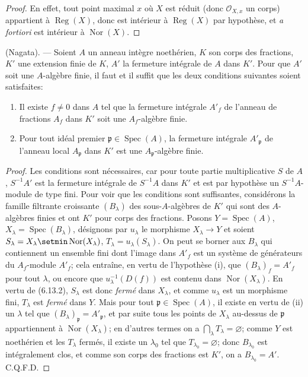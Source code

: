 \begin{proof}
En effet, tout point maximal $x$ où $X$ est réduit (donc
$\mathcal O_{X,x}$ un corps) appartient à $\operatorname{Reg}(X)$, donc est
intérieur à $\operatorname{Reg}(X)$ par hypothèse, et \emph{a fortiori} est
intérieur à $\operatorname{Nor}(X)$.
\end{proof}

\begin{proposition}[6.13.6]
\label{IV.2.s6.13.6-fr}
\textnormal{(Nagata).} --- Soient $A$ un anneau intègre noethérien, $K$ son
corps des fractions, $K'$ une extension finie de $K$, $A'$ la fermeture
intégrale de $A$ dans $K'$. Pour que $A'$ soit une $A$-algèbre finie, il
faut et il suffit que les deux conditions suivantes soient satisfaites:
\begin{enumerate}
\item[\textup{(i)}] Il existe $f\neq0$ dans $A$ tel que la fermeture intégrale $A'_f$
de l'anneau de fractions $A_f$ dans $K'$ soit une $A_f$-algèbre finie.
\item[\textup{(ii)}] Pour tout idéal premier $\mathfrak p\in\operatorname{Spec}(A)$,
la fermeture intégrale $A'_\mathfrak p$ de l'anneau local $A_\mathfrak p$
dans $K'$ est une $A_\mathfrak p$-algèbre finie.
\end{enumerate}
\end{proposition}

\begin{proof}
Les conditions sont nécessaires, car pour toute partie multiplicative $S$
de $A$, $S^{-1}A'$ est la fermeture intégrale de $S^{-1}A$ dans $K'$ et est
par hypothèse un $S^{-1}A$-module de type fini. Pour voir que les conditions
sont suffisantes, considérons la famille filtrante croissante $(B_\lambda)$
des sous-$A$-algèbres de $K'$ qui sont des $A$-algèbres finies et ont $K'$
pour corps des fractions. Posons $Y=\operatorname{Spec}(A)$,
$X_\lambda=\operatorname{Spec}(B_\lambda)$, désignons par $u_\lambda$ le
morphisme $X_\lambda\to Y$ et soient
$S_\lambda=X_\lambda\setmin\operatorname{Nor}(X_\lambda)$,
$T_\lambda=u_\lambda(S_\lambda)$. On peut se borner aux $B_\lambda$ qui
contiennent un ensemble fini dont l'image dans $A'_f$ est un système de
générateurs du $A_f$-module $A'_f$; cela entraîne, en vertu de l'hypothèse
(i), que $(B_\lambda)_f=A'_f$ pour tout $\lambda$, ou encore que
$u_\lambda^{-1}(D(f))$ est contenu dans $\operatorname{Nor}(X_\lambda)$. En
vertu de (6.13.2), $S_\lambda$ est donc \emph{fermé} dans $X_\lambda$, et comme
$u_\lambda$ est un morphisme fini, $T_\lambda$ est \emph{fermé} dans $Y$. Mais
pour tout $\mathfrak p\in\operatorname{Spec}(A)$, il existe en vertu de
(ii) un $\lambda$ tel que $(B_\lambda)_\mathfrak p=A'_\mathfrak p$, et par
suite tous les points
de $X_\lambda$ au-dessus de $\mathfrak p$ appartiennent à
$\operatorname{Nor}(X_\lambda)$; en d'autres termes on a
$\bigcap_\lambda T_\lambda=\varnothing$; comme $Y$ est noethérien et les
$T_\lambda$ fermés, il existe un $\lambda_0$ tel que
$T_{\lambda_0}=\varnothing$; donc $B_{\lambda_0}$ est intégralement clos, et comme
son corps des fractions est $K'$, on a $B_{\lambda_0}=A'$. C.Q.F.D.
\end{proof}

